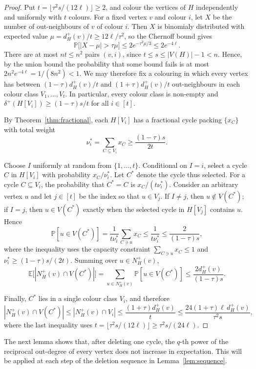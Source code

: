 \documentclass[10pt,a4paper]{article}
\numberwithin{equation}{section}
\begin{document}
\begin{proof}
Put $t=\lfloor\tau^2s/(12\ell)\rfloor\ge2$, and colour the vertices of
$H$ independently and uniformly with $t$ colours. For a fixed vertex
$v$ and colour $i$, let $X$ be the number of out-neighbours of $v$ of
colour $i$. Then $X$ is binomialy distributed with expected value
$\mu=d_H^+(v)/t\ge12\ell/\tau^2$, so the Chernoff bound  gives
$$
\mathbb P\bigl[|X-\mu|>\tau\mu\bigr]\le2e^{-\tau^2\mu/3}\le2e^{-4\ell}.
$$
There are at most $nt\le n^2$ pairs $(v,i)$, since
$t\le s\le|V(H)|-1<n$. Hence, by the union bound the probability that some bound fails is at
most $2n^2e^{-4\ell}=1/(8n^2)<1$. We may therefore fix a colouring in
which every vertex has between $(1-\tau)d_H^+(v)/t$ and
$(1+\tau)d_H^+(v)/t$ out-neighbours in each colour class
$V_1,\ldots,V_t$. In particular, every colour class is non-empty and
$\delta^+(H[V_i])\ge(1-\tau)s/t$ for all $i\in [t]$.

By Theorem~\ref{thm:fractional}, each $H[V_i]$ has a fractional cycle
packing $\{x_C\}$ with total weight
$$
\nu_i^\ast=\sum_{C\subseteq V_i}x_C\ge\frac{(1-\tau)s}{2t}.
$$

Choose $I$ uniformly at random from $\{1,\ldots,t\}$. Conditional on
$I=i$, select a cycle $C$ in $H[V_i]$ with probability $x_C/\nu_i^\ast$.
Let $C^\ast$ denote the cycle thus selected. For a cycle
$C\subseteq V_i$, the probability that $C^\ast=C$ is $x_C/(t\nu_i^\ast)$. Consider an arbitrary vertex $u$ and let $j\in [t]$ be the index so that $u\in V_j$. If $I\ne j$, then $u\notin V(C^\ast)$; if $I=j$, then
$u\in V(C^\ast)$ exactly when the selected cycle in $H[V_j]$ contains
$u$. Hence
$$
\mathbb P[u\in V(C^\ast)]
=\frac{1}{t\nu_i^\ast}\sum_{C\ni u}x_C
\le\frac{1}{t\nu_i^\ast}
\le\frac{2}{(1-\tau)s},
$$
where the inequality uses the capacity constraint
$\sum_{C\ni u}x_C\le1$ and $\nu_i^\ast\ge(1-\tau)s/(2t)$. Summing over
$u\in N_H^+(v)$,
$$
\mathbb E\bigl[|N_H^+(v)\cap V(C^\ast)|\bigr]
=\sum_{u\in N_H^+(v)}\mathbb P[u\in V(C^\ast)]
\le\frac{2d_H^+(v)}{(1-\tau)s}.
$$

Finally, $C^\ast$ lies in a single colour class $V_i$, and therefore
$$
|N_H^+(v)\cap V(C^\ast)|
\le |N_H^+(v)\cap V_i|
\le\frac{(1+\tau)d_H^+(v)}{t}
\le\frac{24(1+\tau)\ell\,d_H^+(v)}{\tau^2s},
$$
where the last inequality uses $t=\lfloor\tau^2s/(12\ell)\rfloor\ge\tau^2s/(24\ell)$.
\end{proof}


The next lemma shows that, after deleting one cycle, the $q$-th power of
the reciprocal out-degree of every vertex does not increase in
expectation. This will be applied at each step of the deletion sequence
in Lemma~\ref{lem:sequence}.
\end{document}
